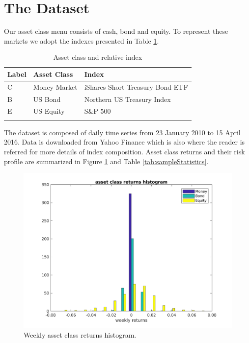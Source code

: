\section{The Dataset}\label{sec:The_Dataset}
Our asset class menu consists of cash, bond and equity. To represent these markets we adopt the indexes presented in Table \ref{tab:indexes}.
\begin{table}[h] \label{tab:indexes}
	\centering
	\begin{tabular}{@{}lll@{}} \toprule
		Label & Asset Class & Index\\ \midrule
		C & Money Market & iShares Short Treasury Bond ETF\\
		\addlinespace[0.5em]
		B & US Bond  & Northern US Treasury Index \\
		\addlinespace[0.5em]
	    E &	US Equity &  {S\&P 500}\\ \bottomrule
		\addlinespace[0.5em]
	\end{tabular}
	\caption{Asset class and relative index}
\end{table}
The dataset is composed of daily time series from 23 January 2010 to 15 April 2016. Data is downloaded from Yahoo Finance which is also where the reader is referred for more details of index composition. Asset class returns and their risk profile are summarized in Figure \ref{fig:assetclassReturns} and Table \ref{tab:sampleStatistics}.
\begin{figure}[h]\label{fig:assetclassReturns}
	\centering
	\includegraphics[scale=0.6]{Images/ReturnsHist.png}
	\caption{Weekly asset class returns histogram.}
\end{figure}
